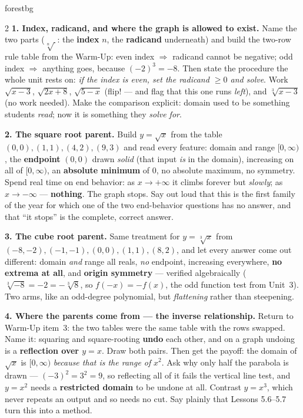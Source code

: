 \documentclass[10pt]{article}
\begin{document}
\begin{skillbox}[Lesson]{forestbg}
\begin{multicols}{2}
\textbf{1. Index, radicand, and where the graph is allowed to exist.} Name the two parts
($\sqrt[n]{\ }$: the \textbf{index} $n$, the \textbf{radicand} underneath) and build the two-row rule
table from the Warm-Up: even index $\Rightarrow$ radicand cannot be negative; odd index $\Rightarrow$
anything goes, because $(-2)^3=-8$. Then state the procedure the whole unit rests on: \emph{if the
index is even, set the radicand $\ge0$ and solve}. Work $\sqrt{x-3}$, $\sqrt{2x+8}$, $\sqrt{5-x}$
(flip! --- and flag that this one runs \emph{left}), and $\sqrt[3]{x-3}$ (no work needed). Make the
comparison explicit: domain used to be something students \emph{read}; now it is something they
\emph{solve for}.

\textbf{2. The square root parent.} Build $y=\sqrt{x}$ from the table $(0,0),(1,1),(4,2),(9,3)$ and
read every feature: domain and range $[0,\infty)$, the \textbf{endpoint} $(0,0)$ drawn \emph{solid}
(that input \emph{is} in the domain), increasing on all of $[0,\infty)$, an \textbf{absolute minimum}
of $0$, no absolute maximum, no symmetry. Spend real time on end behavior: as $x\to+\infty$ it climbs
forever but \emph{slowly}; as $x\to-\infty$ --- \textbf{nothing}. The graph stops. Say out loud that
this is the first family of the year for which one of the two end-behavior questions has no answer,
and that ``it stops'' is the complete, correct answer.

\columnbreak

\textbf{3. The cube root parent.} Same treatment for $y=\sqrt[3]{x}$ from
$(-8,-2),(-1,-1),(0,0),(1,1),(8,2)$, and let every answer come out different: domain \emph{and} range
all reals, \emph{no} endpoint, increasing everywhere, \textbf{no extrema at all}, and \textbf{origin
symmetry} --- verified algebraically ($\sqrt[3]{-8}=-2=-\sqrt[3]{8}$, so $f(-x)=-f(x)$, the odd
function test from Unit~3). Two arms, like an odd-degree polynomial, but \emph{flattening} rather than
steepening.

\textbf{4. Where the parents come from --- the inverse relationship.} Return to Warm-Up item~3: the
two tables were the same table with the rows swapped. Name it: squaring and square-rooting
\textbf{undo} each other, and on a graph undoing is a \textbf{reflection over $y=x$}. Draw both pairs.
Then get the payoff: the domain of $\sqrt{x}$ is $[0,\infty)$ \emph{because that is the range of}
$x^2$. Ask why only half the parabola is drawn --- $(-3)^2=3^2=9$, so reflecting all of it fails the
vertical line test, and $y=x^2$ needs a \textbf{restricted domain} to be undone at all. Contrast
$y=x^3$, which never repeats an output and so needs no cut. Say plainly that Lessons 5.6--5.7 turn
this into a method.


\end{multicols}
\end{skillbox}
\end{document}
